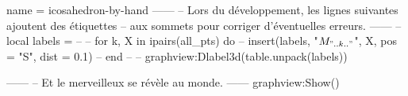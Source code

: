 \documentclass{standalone}
\begin{document}
\begin{luadraw}{name = icosahedron-by-hand}
------
-- Lors du développement, les lignes suivantes ajoutent des étiquettes
-- aux sommets pour corriger d'éventuelles erreurs.
------
-- local labels = {}
--
-- for k, X in ipairs(all_pts) do
--   insert(labels, {"$M_{".. k .."}$", X, {pos = "S", dist = 0.1}})
-- end
--
-- graphview:Dlabel3d(table.unpack(labels))

------
-- Et le merveilleux se révèle au monde.
------
graphview:Show()
\end{luadraw}
\end{document}
